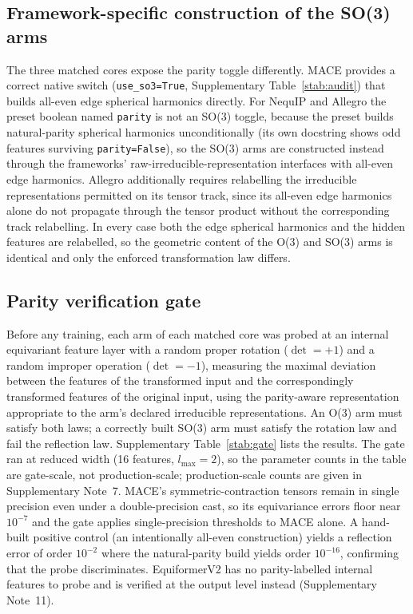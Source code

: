 \subsection*{Framework-specific construction of the SO(3) arms}

The three matched cores expose the parity toggle differently. MACE provides a correct native switch (\texttt{use\_so3=True}, Supplementary Table~\ref{stab:audit}) that builds all-even edge spherical harmonics directly. For NequIP and Allegro the preset boolean named \texttt{parity} is not an SO(3) toggle, because the preset builds natural-parity spherical harmonics unconditionally (its own docstring shows odd features surviving \texttt{parity=False}), so the SO(3) arms are constructed instead through the frameworks' raw-irreducible-representation interfaces with all-even edge harmonics. Allegro additionally requires relabelling the irreducible representations permitted on its tensor track, since its all-even edge harmonics alone do not propagate through the tensor product without the corresponding track relabelling. In every case both the edge spherical harmonics and the hidden features are relabelled, so the geometric content of the O(3) and SO(3) arms is identical and only the enforced transformation law differs.

\subsection*{Parity verification gate}

Before any training, each arm of each matched core was probed at an internal equivariant feature layer with a random proper rotation ($\det = +1$) and a random improper operation ($\det = -1$), measuring the maximal deviation between the features of the transformed input and the correspondingly transformed features of the original input, using the parity-aware representation appropriate to the arm's declared irreducible representations. An O(3) arm must satisfy both laws; a correctly built SO(3) arm must satisfy the rotation law and fail the reflection law. Supplementary Table~\ref{stab:gate} lists the results. The gate ran at reduced width (16 features, $l_{\max}=2$), so the parameter counts in the table are gate-scale, not production-scale; production-scale counts are given in Supplementary Note~7. MACE's symmetric-contraction tensors remain in single precision even under a double-precision cast, so its equivariance errors floor near $10^{-7}$ and the gate applies single-precision thresholds to MACE alone. A hand-built positive control (an intentionally all-even construction) yields a reflection error of order $10^{-2}$ where the natural-parity build yields order $10^{-16}$, confirming that the probe discriminates. EquiformerV2 has no parity-labelled internal features to probe and is verified at the output level instead (Supplementary Note~11).

